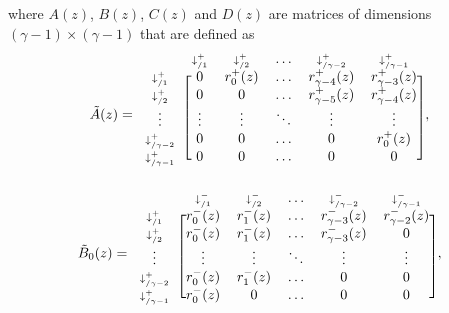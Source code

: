 \documentclass{article}
\begin{document}
where $A(z)$, $B(z)$, $C(z)$ and $D(z)$ are matrices of dimensions
$(\gamma-1) \times (\gamma-1)$ that are defined as
\begin{equation*}
\tilde{A}(z) = 
\begin{blockarray}{cccccc}
   & \scriptstyle{\downarrow_{/1}^+} & \scriptstyle{\downarrow_{/2}^+} &
    \ldots & \scriptstyle{\downarrow_{/\gamma-2}^+} &
    \scriptstyle{\downarrow_{/\gamma-1}^+} \\
\begin{block}{c[ccccc]}
\scriptstyle{\downarrow_{/1}^+} & 0 & r_0^+(z) & \ldots &
    r_{\gamma-4}^+(z) & r_{\gamma-3}^+(z) \\
\scriptstyle{\downarrow_{/2}^+} & 0 & 0 & \ldots &
    r_{\gamma-5}^+(z) & r_{\gamma-4}^+(z) \\
\vdots & \vdots & \vdots & \ddots & \vdots & \vdots \\
\scriptstyle{\downarrow_{/\gamma-2}^+} & 0 & 0 & \ldots & 0 & r_0^+(z) \\
\scriptstyle{\downarrow_{/\gamma-1}^+} & 0 & 0 & \ldots & 0 & 0 \\
\end{block}
\end{blockarray},
\end{equation*}
\begin{equation*}
\tilde{B}_0(z) = 
\begin{blockarray}{cccccc}
   & \scriptstyle{\downarrow_{/1}^-} & \scriptstyle{\downarrow_{/2}^-} &
   \ldots & \scriptstyle{\downarrow_{/\gamma-2}^-} &
   \scriptstyle{\downarrow_{/\gamma-1}^-} \\
\begin{block}{c[ccccc]}
\scriptstyle{\downarrow_{/1}^+} & r_0^-(z) & r_1^-(z) & \ldots &
    r_{\gamma-3}^-(z) & r_{\gamma-2}^-(z) \\
\scriptstyle{\downarrow_{/2}^+} & r_0^-(z) & r_1^-(z) & \ldots &
    r_{\gamma-3}^-(z) & 0 \\
\vdots & \vdots & \vdots & \ddots & \vdots & \vdots \\
\scriptstyle{\downarrow_{/\gamma-2}^+} & r_0^-(z) & r_1^-(z) &
    \ldots & 0 & 0 \\
\scriptstyle{\downarrow_{/\gamma-1}^+} & r_0^-(z) & 0 & \ldots & 0 & 0 \\
\end{block}
\end{blockarray},
\end{equation*}
\end{document}
